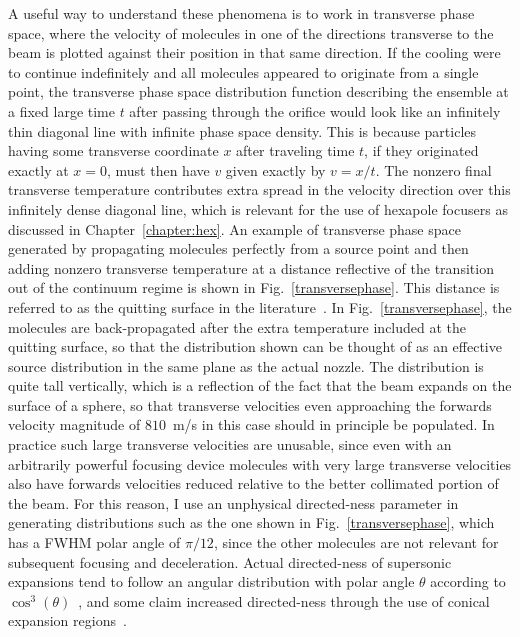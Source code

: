 A useful way to understand these phenomena is to work in transverse phase space, where the velocity of molecules in one of the directions transverse to the beam is plotted against their position in that same direction.
If the cooling were to continue indefinitely and all molecules appeared to originate from a single point, the transverse phase space distribution function describing the ensemble at a fixed large time $t$ after passing through the orifice would look like an infinitely thin diagonal line with infinite phase space density. 
This is because particles having some transverse coordinate $x$ after traveling time $t$, if they originated exactly at $x=0$, must then have $v$ given exactly by $v = x/t$.
The nonzero final transverse temperature contributes extra spread in the velocity direction over this infinitely dense diagonal line, which is relevant for the use of hexapole focusers as discussed in Chapter~\ref{chapter:hex}.
An example of transverse phase space generated by propagating molecules perfectly from a source point and then adding nonzero transverse temperature at a distance reflective of the transition out of the continuum regime is shown in Fig.~\ref{transversephase}.
This distance is referred to as the quitting surface in the literature~\cite{Miller1988}.
In Fig.~\ref{transversephase}, the molecules are back-propagated after the extra temperature included at the quitting surface, so that the distribution shown can be thought of as an effective source distribution in the same plane as the actual nozzle.
The distribution is quite tall vertically, which is a reflection of the fact that the beam expands on the surface of a sphere, so that transverse velocities even approaching the forwards velocity magnitude of $810$~m/s in this case should in principle be populated.
In practice such large transverse velocities are unusable, since even with an arbitrarily powerful focusing device molecules with very large transverse velocities also have forwards velocities reduced relative to the better collimated portion of the beam.
For this reason, I use an unphysical directed-ness parameter in generating distributions such as the one shown in Fig.~\ref{transversephase}, which has a FWHM polar angle of $\pi/12$, since the other molecules are not relevant for subsequent focusing and deceleration.
Actual directed-ness of supersonic expansions tend to follow an angular distribution with polar angle $\theta$ according to $\cos^3(\theta)$~\cite{Miller1988}, and some claim increased directed-ness through the use of conical expansion regions~\cite[Fig.~11]{Even2015}.

